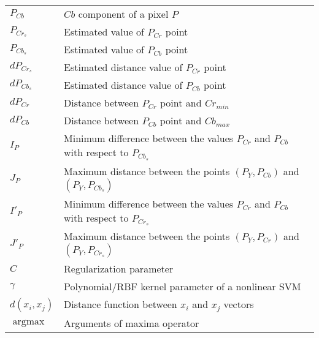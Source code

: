 \documentclass[11pt,twoside,a4paper]{book}
\theoremstyle{plain}
\theoremstyle{definition}
\DeclareMathOperator*{\argmax}{argmax}
\begin{document}
\begin{tabular}{ll}
    $P_{Cb}$    & $Cb$ component of a pixel $P$ \\
    $P_{Cr_{s}}$& Estimated value of $P_{Cr}$ point \\
    $P_{Cb_{s}}$& Estimated value of $P_{Cb}$ point \\
    $dP_{Cr_{s}}$& Estimated distance value of $P_{Cr}$ point \\
    $dP_{Cb_{s}}$& Estimated distance value of $P_{Cb}$ point \\
    $dP_{Cr}$   & Distance between $P_{Cr}$ point and $Cr_{min}$ \\
    $dP_{Cb}$   & Distance between $P_{Cb}$ point and $Cb_{max}$ \\
    $I_P$       & Minimum difference between the values $P_{Cr}$ and $P_{Cb}$ with respect to $P_{Cb_s}$ \\
    $J_P$       & Maximum distance between the points $(P_Y, P_{Cb})$ and $(P_Y, P_{Cb_s})$ \\
    $I'_P$      & Minimum difference between the values $P_{Cr}$ and $P_{Cb}$ with respect to $P_{Cr_s}$ \\
    $J'_P$      & Maximum distance between the points $(P_Y, P_{Cr})$ and $(P_Y, P_{Cr_s})$ \\
    $C$         & Regularization parameter \\
    $\gamma$    & Polynomial/RBF kernel parameter of a nonlinear SVM \\
    $d(x_i, x_j)$& Distance function between $x_i$ and $x_j$ vectors \\
    $\argmax$   & Arguments of maxima operator \\
\end{tabular}

\listoffigures            
\listoftables            

\mainmatter

\fancyhead[RE,LO]{\thesection}

\singlespacing              %







\end{document}
